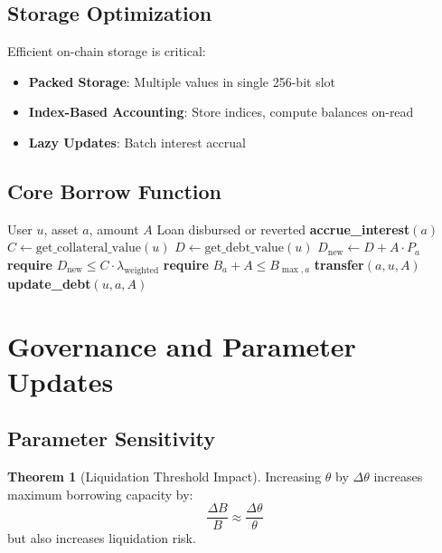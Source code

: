 \documentclass[11pt,a4paper]{article}
\theoremstyle{definition}
\newtheorem{theorem}{Theorem}
\begin{document}
\subsection{Storage Optimization}

Efficient on-chain storage is critical:

\begin{itemize}
\item \textbf{Packed Storage}: Multiple values in single 256-bit slot
\item \textbf{Index-Based Accounting}: Store indices, compute balances on-read
\item \textbf{Lazy Updates}: Batch interest accrual
\end{itemize}

\subsection{Core Borrow Function}

\begin{algorithm}
\caption{Borrow Execution}
\begin{algorithmic}[1]
\Require User $u$, asset $a$, amount $A$
\Ensure Loan disbursed or reverted
\State \textbf{accrue\_interest}$(a)$
\State $C \gets \text{get\_collateral\_value}(u)$
\State $D \gets \text{get\_debt\_value}(u)$
\State $D_{\text{new}} \gets D + A \cdot P_a$
\State \textbf{require} $D_{\text{new}} \leq C \cdot \lambda_{\text{weighted}}$
\State \textbf{require} $B_a + A \leq B_{\max,a}$
\State \textbf{transfer}$(a, u, A)$
\State \textbf{update\_debt}$(u, a, A)$
\end{algorithmic}
\end{algorithm}

\section{Governance and Parameter Updates}

\subsection{Parameter Sensitivity}

\begin{theorem}[Liquidation Threshold Impact]
Increasing $\theta$ by $\Delta\theta$ increases maximum borrowing capacity by:
\begin{equation}
\frac{\Delta B}{B} \approx \frac{\Delta\theta}{\theta}
\end{equation}
but also increases liquidation risk.
\end{theorem}
\end{document}
